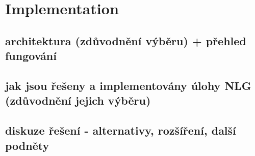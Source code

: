 \chapter{Implementation}

\section{architektura (zdůvodnění výběru) + přehled fungování }

\section{jak jsou řešeny a implementovány úlohy NLG (zdůvodnění jejich výběru)}

\section{diskuze řešení - alternativy, rozšíření, další podněty}
